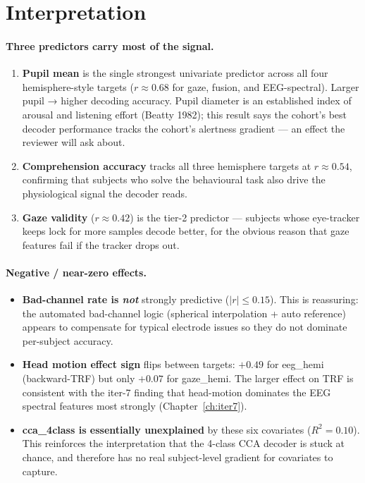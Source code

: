 \section{Interpretation}

\paragraph{Three predictors carry most of the signal.}
\begin{enumerate}
  \item \textbf{Pupil mean} is the single strongest univariate predictor
        across all four hemisphere-style targets ($r \approx 0.68$ for
        gaze, fusion, and EEG-spectral). Larger pupil → higher decoding
        accuracy. Pupil diameter is an established index of arousal and
        listening effort (Beatty 1982); this result says the cohort's
        best decoder performance tracks the cohort's alertness
        gradient --- an effect the reviewer will ask about.
  \item \textbf{Comprehension accuracy} tracks all three hemisphere
        targets at $r \approx 0.54$, confirming that subjects who
        solve the behavioural task also drive the physiological signal
        the decoder reads.
  \item \textbf{Gaze validity} ($r \approx 0.42$) is the tier-2
        predictor --- subjects whose eye-tracker keeps lock for more
        samples decode better, for the obvious reason that gaze features
        fail if the tracker drops out.
\end{enumerate}

\paragraph{Negative / near-zero effects.}
\begin{itemize}
  \item \textbf{Bad-channel rate is \emph{not}} strongly predictive
        ($|r| \leq 0.15$). This is reassuring: the automated
        bad-channel logic (spherical interpolation + auto reference)
        appears to compensate for typical electrode issues so they do
        not dominate per-subject accuracy.
  \item \textbf{Head motion effect sign} flips between targets:
        $+0.49$ for eeg\_hemi (backward-TRF) but only $+0.07$ for
        gaze\_hemi. The larger effect on TRF is consistent with the
        iter-7 finding that head-motion dominates the EEG spectral
        features most strongly (Chapter~\ref{ch:iter7}).
  \item \textbf{cca\_4class is essentially unexplained} by these six
        covariates ($R^2 = 0.10$). This reinforces the interpretation
        that the 4-class CCA decoder is stuck at chance, and therefore
        has no real subject-level gradient for covariates to capture.
\end{itemize}

